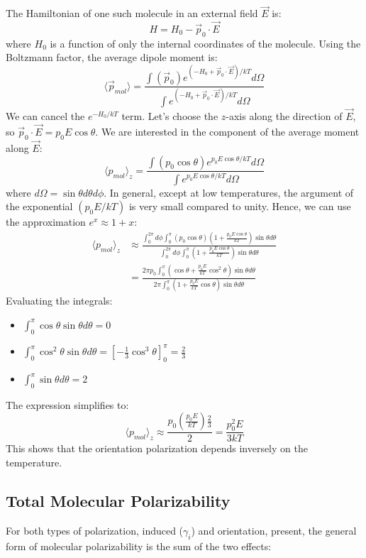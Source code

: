 \documentclass{article}
\begin{document}
	The Hamiltonian of one such molecule in an external field $\vec{E}$ is:
	\[
	H = H_0 - \vec{p}_0 \cdot \vec{E}
	\]
	where $H_0$ is a function of only the internal coordinates of the molecule.
	Using the Boltzmann factor, the average dipole moment is:
	\[
	\langle \vec{p}_{mol} \rangle = \frac{\int (\vec{p}_0) e^{(-H_0 + \vec{p}_0 \cdot \vec{E})/kT} d\Omega}{\int e^{(-H_0 + \vec{p}_0 \cdot \vec{E})/kT} d\Omega}
	\]
	We can cancel the $e^{-H_0/kT}$ term. Let's choose the $z$-axis along the direction of $\vec{E}$, so $\vec{p}_0 \cdot \vec{E} = p_0 E \cos\theta$. We are interested in the component of the average moment along $\vec{E}$:
	\[
	\langle p_{mol} \rangle_z = \frac{\int (p_0 \cos\theta) e^{p_0 E \cos\theta / kT} d\Omega}{\int e^{p_0 E \cos\theta / kT} d\Omega}
	\]
	where $d\Omega = \sin\theta d\theta d\phi$. In general, except at low temperatures, the argument of the exponential $(p_0 E / kT)$ is very small compared to unity. Hence, we can use the approximation $e^x \approx 1+x$:
	\begin{align*}
		\langle p_{mol} \rangle_z &\approx \frac{\int_0^{2\pi} d\phi \int_0^\pi (p_0 \cos\theta)(1 + \frac{p_0 E \cos\theta}{kT}) \sin\theta d\theta}{\int_0^{2\pi} d\phi \int_0^\pi (1 + \frac{p_0 E \cos\theta}{kT}) \sin\theta d\theta} \\
		&= \frac{2\pi p_0 \int_0^\pi (\cos\theta + \frac{p_0 E}{kT}\cos^2\theta) \sin\theta d\theta}{2\pi \int_0^\pi (1 + \frac{p_0 E}{kT}\cos\theta) \sin\theta d\theta}
	\end{align*}
	Evaluating the integrals:
	\begin{itemize}
		\item $\int_0^\pi \cos\theta \sin\theta d\theta = 0$
		\item $\int_0^\pi \cos^2\theta \sin\theta d\theta = [-\frac{1}{3}\cos^3\theta]_0^\pi = \frac{2}{3}$
		\item $\int_0^\pi \sin\theta d\theta = 2$
	\end{itemize}
	The expression simplifies to:
	\[
	\langle p_{mol} \rangle_z \approx \frac{p_0 (\frac{p_0 E}{kT}) \frac{2}{3}}{2} = \frac{p_0^2 E}{3kT}
	\]
	This shows that the orientation polarization depends inversely on the temperature.
	
	\subsection{Total Molecular Polarizability}
	For both types of polarization, induced ($\gamma_i$) and orientation, present, the general form of molecular polarizability is the sum of the two effects:
	
\end{document}
